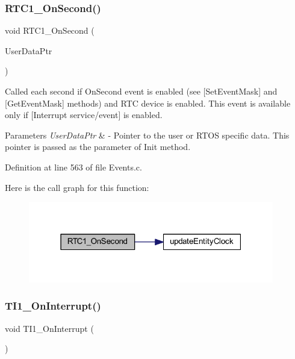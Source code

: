 \subsubsection{\texorpdfstring{R\+T\+C1\+\_\+\+On\+Second()}{RTC1\_OnSecond()}}
{\footnotesize\ttfamily void R\+T\+C1\+\_\+\+On\+Second (\begin{DoxyParamCaption}\item[{L\+D\+D\+\_\+\+T\+User\+Data $\ast$}]{User\+Data\+Ptr }\end{DoxyParamCaption})}



Called each second if On\+Second event is enabled (see \mbox{[}Set\+Event\+Mask\mbox{]} and \mbox{[}Get\+Event\+Mask\mbox{]} methods) and R\+TC device is enabled. This event is available only if \mbox{[}Interrupt service/event\mbox{]} is enabled. 


\begin{DoxyParams}{Parameters}
{\em User\+Data\+Ptr} & -\/ Pointer to the user or R\+T\+OS specific data. This pointer is passed as the parameter of Init method. \\
\hline
\end{DoxyParams}


Definition at line 563 of file Events.\+c.

Here is the call graph for this function\+:
\nopagebreak
\begin{figure}[H]
\begin{center}
\leavevmode
\includegraphics[width=304pt]{group___events__module_ga2f94110e651cb30cba928647e91e92d4_cgraph}
\end{center}
\end{figure}
\mbox{\label{group___events__module_ga01b566cf25a21b34152513dcb1321a11}} 
\subsubsection{\texorpdfstring{T\+I1\+\_\+\+On\+Interrupt()}{TI1\_OnInterrupt()}}
{\footnotesize\ttfamily void T\+I1\+\_\+\+On\+Interrupt (\begin{DoxyParamCaption}\item[{void}]{ }\end{DoxyParamCaption})}

